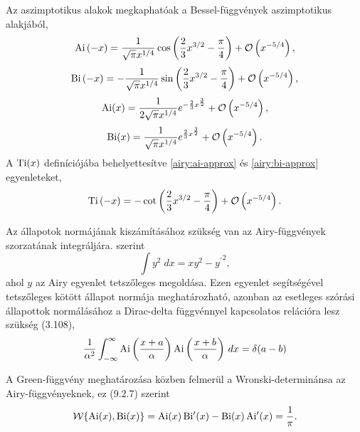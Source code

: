 Az aszimptotikus alakok megkaphatóak a Bessel-függvények aszimptotikus alakjából, 
\begin{equation}
	\operatorname{Ai}\left(-x\right) = \frac{1}{\sqrt{\pi}x^{1/4}}\cos\left(\frac{2}{3}x^{3/2} - \frac{\pi}{4}\right) + \mathcal{O}\left(x^{-5/4}\right),
	\label{airy:ai-approx}
\end{equation}
\begin{equation}
	\operatorname{Bi}\left(-x\right) = -\frac{1}{\sqrt{\pi}x^{1/4}}\sin\left(\frac{2}{3}x^{3/2} - \frac{\pi}{4}\right) + \mathcal{O}\left(x^{-5/4}\right),
	\label{airy:bi-approx}
\end{equation}
\begin{equation}
	\operatorname{Ai}(x) = \frac{1}{2\sqrt{\pi}x^{1/4}}e^{-\frac{2}{3}x^{\frac{3}{2}}}+\mathcal{O}\left(x^{-5/4}\right),
	\label{airy:ai+approx}
\end{equation}
\begin{equation}
	\operatorname{Bi}(x) = \frac{1}{ \sqrt{\pi}x^{1/4}}e^{ \frac{2}{3}x^{\frac{3}{2}}}+\mathcal{O}\left(x^{-5/4}\right).
	\label{airy:bi+approx}
\end{equation}
A $\operatorname{Ti}(x)$ definíciójába behelyettesítve \eqref{airy:ai-approx} és \eqref{airy:bi-approx} egyenleteket,
\begin{equation}
	\operatorname{Ti}\left(-x\right) = -\cot\left( \frac{2}{3}x^{3/2} - \frac{\pi}{4} \right) + \mathcal{O}\left(x^{-5/4}\right).
	\label{airy:tiapprox}
\end{equation}

Az állapotok normájának kiszámításához szükség van az Airy-függvények szorzatának integráljára. \cite[A.16]{Albright_1977} szerint
\begin{equation}
	\int y^2\;dx = xy^2 - {y^\prime}^2,
	\label{airy:normintegral}
\end{equation}
ahol $y$ az Airy egyenlet tetszőleges megoldása. Ezen egyenlet segítségével tetszőleges kötött állapot normája meghatározható, azonban az esetleges szórási állapottok normálásához a Dirac-delta függvénnyel kapcsolatos relációra lesz szükség \cite{Vallee:2010:AFA} (3.108),
\begin{equation}
	\frac{1}{\alpha^2}\int_{-\infty}^\infty\operatorname{Ai}\left(\frac{x+a}{\alpha}\right)\operatorname{Ai}\left(\frac{x+b}{\alpha}\right)\,dx=\delta(a-b)
	\label{airy:delta}
\end{equation}

A Green-függvény meghatározása közben felmerül a Wronski-determinánsa az Airy-függvényeknek, ez \cite{NIST:DLMF} (9.2.7) szerint
\begin{equation}
	\mathcal{W} \{ \operatorname{Ai}(x), \operatorname{Bi}(x) \} = \operatorname{Ai}(x)\operatorname{Bi^\prime}(x) - \operatorname{Bi}(x)\operatorname{Ai^\prime}(x) = \frac{1}{\pi}.
	\label{airy:wronski}
\end{equation}








